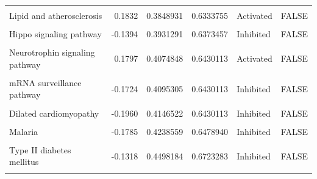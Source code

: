 \documentclass[9pt,a4paper,]{extarticle}
\begin{document}
\begin{table}
{\begin{tabular}[t]{lrrrll}
\cellcolor{gray!6}{Complement and coagulation cascades} & \cellcolor{gray!6}{0.1854} & \cellcolor{gray!6}{0.3844689} & \cellcolor{gray!6}{0.6333755} & \cellcolor{gray!6}{Activated} & \cellcolor{gray!6}{FALSE}\\
Lipid and atherosclerosis & 0.1832 & 0.3848931 & 0.6333755 & Activated & FALSE\\
\addlinespace
\cellcolor{gray!6}{RNA degradation} & \cellcolor{gray!6}{-0.1472} & \cellcolor{gray!6}{0.3877205} & \cellcolor{gray!6}{0.6333755} & \cellcolor{gray!6}{Inhibited} & \cellcolor{gray!6}{FALSE}\\
Hippo signaling pathway & -0.1394 & 0.3931291 & 0.6373457 & Inhibited & FALSE\\
\cellcolor{gray!6}{Serotonergic synapse} & \cellcolor{gray!6}{-0.1831} & \cellcolor{gray!6}{0.4021622} & \cellcolor{gray!6}{0.6430113} & \cellcolor{gray!6}{Inhibited} & \cellcolor{gray!6}{FALSE}\\
Neurotrophin signaling pathway & 0.1797 & 0.4074848 & 0.6430113 & Activated & FALSE\\
\cellcolor{gray!6}{Gastric cancer} & \cellcolor{gray!6}{-0.1648} & \cellcolor{gray!6}{0.4093532} & \cellcolor{gray!6}{0.6430113} & \cellcolor{gray!6}{Inhibited} & \cellcolor{gray!6}{FALSE}\\
\addlinespace
mRNA surveillance pathway & -0.1724 & 0.4095305 & 0.6430113 & Inhibited & FALSE\\
\cellcolor{gray!6}{Glutamatergic synapse} & \cellcolor{gray!6}{-0.2193} & \cellcolor{gray!6}{0.4140018} & \cellcolor{gray!6}{0.6430113} & \cellcolor{gray!6}{Inhibited} & \cellcolor{gray!6}{FALSE}\\
Dilated cardiomyopathy & -0.1960 & 0.4146522 & 0.6430113 & Inhibited & FALSE\\
\cellcolor{gray!6}{Huntington disease} & \cellcolor{gray!6}{0.1427} & \cellcolor{gray!6}{0.4194615} & \cellcolor{gray!6}{0.6457897} & \cellcolor{gray!6}{Activated} & \cellcolor{gray!6}{FALSE}\\
Malaria & -0.1785 & 0.4238559 & 0.6478940 & Inhibited & FALSE\\
\addlinespace
\cellcolor{gray!6}{Regulation of lipolysis in adipocytes} & \cellcolor{gray!6}{0.1538} & \cellcolor{gray!6}{0.4449887} & \cellcolor{gray!6}{0.6723283} & \cellcolor{gray!6}{Activated} & \cellcolor{gray!6}{FALSE}\\
Type II diabetes mellitus & -0.1318 & 0.4498184 & 0.6723283 & Inhibited & FALSE\\
\cellcolor{gray!6}{Toll-like receptor signaling pathway} & \cellcolor{gray!6}{-0.1561} & \cellcolor{gray!6}{0.4513085} & \cellcolor{gray!6}{0.6723283} & \cellcolor{gray!6}{Inhibited} & \cellcolor{gray!6}{FALSE}\\

\end{tabular}}
\end{table}
\end{document}
